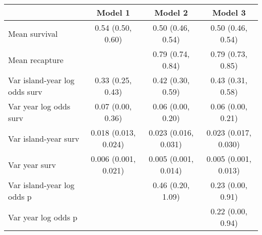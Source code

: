 \begin{tabular}{lccc}
  \hline
\multicolumn{1}{c}{ } & \multicolumn{1}{c}{Model 1} & \multicolumn{1}{c}{Model 2} & \multicolumn{1}{c}{Model 3} \\ 
  \hline
Mean survival & 0.54 (0.50, 0.60) & 0.50 (0.46, 0.54) & 0.50 (0.46, 0.54) \\ 
  Mean recapture &  & 0.79 (0.74, 0.84) & 0.79 (0.73, 0.85) \\ 
  Var island-year log odds surv & 0.33 (0.25, 0.43) & 0.42 (0.30, 0.59) & 0.43 (0.31, 0.58) \\ 
  Var year log odds surv & 0.07 (0.00, 0.36) & 0.06 (0.00, 0.20) & 0.06 (0.00, 0.21) \\ 
  Var island-year surv & 0.018 (0.013, 0.024) & 0.023 (0.016, 0.031) & 0.023 (0.017, 0.030) \\ 
  Var year surv & 0.006 (0.001, 0.021) & 0.005 (0.001, 0.014) & 0.005 (0.001, 0.013) \\ 
  Var island-year log odds p &  & 0.46 (0.20, 1.09) & 0.23 (0.00, 0.91) \\ 
  Var year log odds p &  &  & 0.22 (0.00, 0.94) \\ 
   \hline
\end{tabular}
